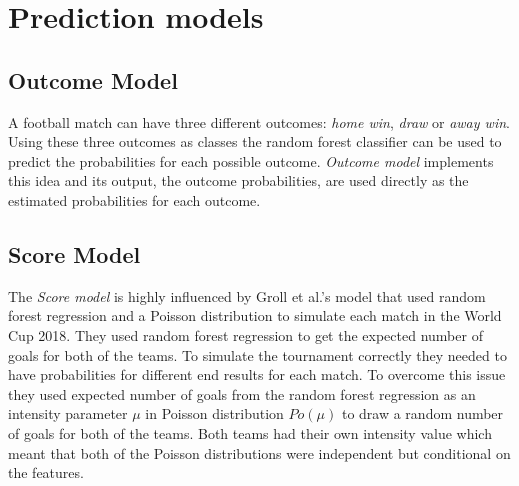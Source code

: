 \section{Prediction models}
\subsection{Outcome Model}
A football match can have three different outcomes: \textit{home win}, \textit{draw} or \textit{away win}. Using these three outcomes as classes the random forest classifier can be used to predict the probabilities for each possible outcome. \textit{Outcome model} implements this idea and its output, the outcome probabilities, are used directly as the estimated probabilities for each outcome.
\subsection{Score Model}
The \textit{Score model} is highly influenced by Groll et al.'s \cite{groll2018prediction} model that used random forest regression and a Poisson distribution to simulate each match in the World Cup 2018. They used random forest regression to get the expected number of goals for both of the teams. To simulate the tournament correctly they needed to have probabilities for different end results for each match. To overcome this issue they used expected number of goals from the random forest regression as an intensity parameter $\mu$ in Poisson distribution $Po(\mu)$ to draw a random number of goals for both of the teams. Both teams had their own intensity value which meant that both of the Poisson distributions were independent but conditional on the features.

